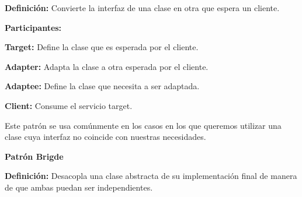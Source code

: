 \documentclass[12pt]{article}
\begin{document}
\begin{multicols}{2}

{\fontsize{9pt}{10.8pt}\selectfont \textbf{Definición:} Convierte la interfaz de una clase en otra que espera un cliente.\par}\par

{\fontsize{9pt}{10.8pt}\selectfont \textbf{Participantes: }\par}\par


\vspace{\baselineskip}
{\fontsize{9pt}{10.8pt}\selectfont \textbf{Target:} Define la clase que es esperada por el cliente. \par}\par

{\fontsize{9pt}{10.8pt}\selectfont \textbf{Adapter:} Adapta la clase a otra esperada por el cliente. \par}\par

{\fontsize{9pt}{10.8pt}\selectfont \textbf{Adaptee:} Define la clase que necesita a ser adaptada. \par}\par

{\fontsize{9pt}{10.8pt}\selectfont \textbf{Client:} Consume el servicio target. \par}\par


\vspace{\baselineskip}
{\fontsize{9pt}{10.8pt}\selectfont Este patrón se usa comúnmente en los casos en los que queremos utilizar una clase cuya interfaz no coincide con nuestras necesidades.\par}\par


\vspace{\baselineskip}

\vspace{\baselineskip}
	\item {\fontsize{9pt}{10.8pt}\selectfont  \textbf{Patrón Brigde}\par}\par

{\fontsize{9pt}{10.8pt}\selectfont \textbf{Definición:} Desacopla una clase abstracta de su implementación final de manera de que ambas puedan ser independientes.\par}\par




\end{multicols}
\end{document}
